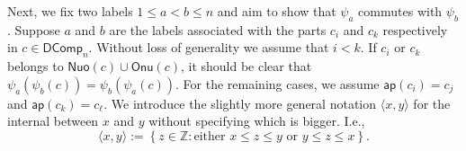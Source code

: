 \documentclass[reqno]{amsart}
\numberwithin{equation}{section}
\theoremstyle{definition}
\theoremstyle{named}
\newcommand{\set}[1]{\left\{#1\right\}}
\newcommand{\bZ}{\mathbb{Z}}
\def\DComp{\mathsf{DComp}}
\def\Nuo{\mathsf{Nuo}}
\def\Onu{\mathsf{Onu}}
\def\Do{\mathsf{Do}}
\def\ap{\mathsf{ap}}
\begin{document}

Next, we fix two labels $1\le a<b\le n$ and aim to show that $\psi_a$ commutes with $\psi_b$. Suppose $a$ and $b$ are the labels associated with the parts $c_i$ and $c_k$ respectively in $c\in\DComp_n$. Without loss of generality we assume that $i<k$. If $c_i$ or $c_k$ belongs to $\Nuo(c)\cup\Onu(c)$, it should be clear that $\psi_a(\psi_b(c))=\psi_b(\psi_a(c))$. For the remaining cases, we assume $\ap(c_i)=c_j$ and $\ap(c_k)=c_{\ell}$. We introduce the slightly more general notation $\langle x,y\rangle$ for the internal between $x$ and $y$ without specifying which is bigger. I.e., 
$$\langle x,y\rangle:=\set{z\in\bZ:\text{either $x\le z\le y$ or $y\le z\le x$}}.$$ 
\end{document}
